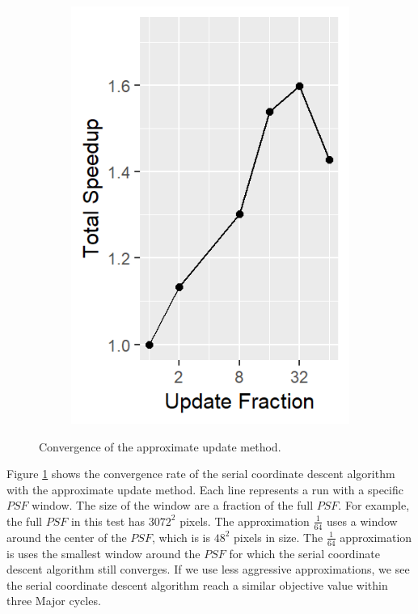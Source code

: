 \begin{figure}[h]
\begin{subfigure}[b]{0.195\linewidth}
	\end{subfigure}
	\begin{subfigure}[b]{0.195\linewidth}
		\includegraphics[width=\linewidth]{./chapters/10.results/gradient/ApproxUpdate/speedup_total.png}
	\end{subfigure}
	
	\caption{Convergence of the approximate update method.}
	\label{results:gradients:update}
\end{figure}

Figure \ref{results:gradients:update} shows the convergence rate of the serial coordinate descent algorithm with the approximate update method. Each line represents a run with a specific $PSF$ window. The size of the window are a fraction of the full $PSF$. For example, the full $PSF$ in this test has $3072^2$ pixels. The approximation $\frac{1}{64}$ uses a window around the center of the $PSF$, which is is $48^2$ pixels in size. The $\frac{1}{64}$  approximation is uses the smallest window around the $PSF$ for which the serial coordinate descent algorithm still converges. If we use less aggressive approximations, we see the serial coordinate descent algorithm reach a similar objective value within three Major cycles. 

